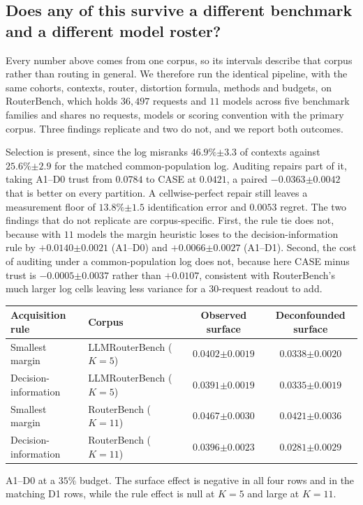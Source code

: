 \documentclass{article}
\theoremstyle{plain}
\theoremstyle{remark}
\newcommand{\se}[1]{{\scriptstyle\pm#1}}
\begin{document}
\subsection{Does any of this survive a different benchmark and a different model roster?}
Every number above comes from one corpus, so its intervals describe that corpus rather than routing
in general. We therefore run the identical pipeline, with the same cohorts, contexts, router,
distortion formula, methods and budgets, on RouterBench, which holds $36{,}497$ requests and $11$
models across five benchmark families and shares no requests, models or scoring convention with the
primary corpus. Three findings replicate and two do not, and we report both outcomes.

Selection is present, since the log misranks $46.9\%\se{3.3}$ of contexts against $25.6\%\se{2.9}$
for the matched common-population log. Auditing repairs part of it, taking A1--D0 trust from $0.0784$
to CASE at $0.0421$, a paired $-0.0363\se{0.0042}$ that is better on every partition. A
cellwise-perfect repair still leaves a measurement floor of $13.8\%\se{1.5}$ identification error and
$0.0053$ regret. The two findings that do not replicate are corpus-specific. First, the rule tie does
not, because with $11$ models the margin heuristic loses to the decision-information rule by
$+0.0140\se{0.0021}$ (A1--D0) and $+0.0066\se{0.0027}$ (A1--D1). Second, the cost of auditing under a
common-population log does not, because here CASE minus trust is $-0.0005\se{0.0037}$ rather than
$+0.0107$, consistent with RouterBench's much larger log cells leaving less variance for a
$30$-request readout to add.

\begin{center}\footnotesize
\begin{tabular}{@{}llcc@{}}
\toprule
Acquisition rule & Corpus & Observed surface & Deconfounded surface\\
\midrule
Smallest margin & LLMRouterBench ($K{=}5$) & $0.0402\se{0.0019}$ & $0.0338\se{0.0020}$\\
Decision-information & LLMRouterBench ($K{=}5$) & $0.0391\se{0.0019}$ & $0.0335\se{0.0019}$\\
Smallest margin & RouterBench ($K{=}11$) & $0.0467\se{0.0030}$ & $0.0421\se{0.0036}$\\
Decision-information & RouterBench ($K{=}11$) & $0.0396\se{0.0023}$ & $0.0281\se{0.0029}$\\
\bottomrule
\end{tabular}
\end{center}
\noindent A1--D0 at a $35\%$ budget. The surface effect is negative in all four rows and in the
matching D1 rows, while the rule effect is null at $K{=}5$ and large at $K{=}11$.
\end{document}
